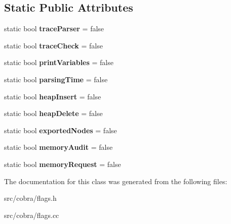 \subsection*{Static Public Attributes}
\begin{DoxyCompactItemize}
\item 
\hypertarget{class_cobra_1_1internal_1_1_flags_ac08d43fe0936cb71bfee597af803dbe2}{static bool {\bfseries trace\+Parser} = false}\label{class_cobra_1_1internal_1_1_flags_ac08d43fe0936cb71bfee597af803dbe2}

\item 
\hypertarget{class_cobra_1_1internal_1_1_flags_a7181e6f3330ab86bff83a6520c74901e}{static bool {\bfseries trace\+Check} = false}\label{class_cobra_1_1internal_1_1_flags_a7181e6f3330ab86bff83a6520c74901e}

\item 
\hypertarget{class_cobra_1_1internal_1_1_flags_ae050100f3071586aebd9a89ec44db04f}{static bool {\bfseries print\+Variables} = false}\label{class_cobra_1_1internal_1_1_flags_ae050100f3071586aebd9a89ec44db04f}

\item 
\hypertarget{class_cobra_1_1internal_1_1_flags_afa0e8679e4526d6edbe06b935da2c4da}{static bool {\bfseries parsing\+Time} = false}\label{class_cobra_1_1internal_1_1_flags_afa0e8679e4526d6edbe06b935da2c4da}

\item 
\hypertarget{class_cobra_1_1internal_1_1_flags_ae77a4d0d2533d664c6234789401ae0fe}{static bool {\bfseries heap\+Insert} = false}\label{class_cobra_1_1internal_1_1_flags_ae77a4d0d2533d664c6234789401ae0fe}

\item 
\hypertarget{class_cobra_1_1internal_1_1_flags_a80d0f082f3e0ea5a10ef9da3ef3d45ed}{static bool {\bfseries heap\+Delete} = false}\label{class_cobra_1_1internal_1_1_flags_a80d0f082f3e0ea5a10ef9da3ef3d45ed}

\item 
\hypertarget{class_cobra_1_1internal_1_1_flags_a1eacd9c9fcaed39873b051cbca8f9424}{static bool {\bfseries exported\+Nodes} = false}\label{class_cobra_1_1internal_1_1_flags_a1eacd9c9fcaed39873b051cbca8f9424}

\item 
\hypertarget{class_cobra_1_1internal_1_1_flags_a14a2af40fa06fc5f063561ffb7497aa4}{static bool {\bfseries memory\+Audit} = false}\label{class_cobra_1_1internal_1_1_flags_a14a2af40fa06fc5f063561ffb7497aa4}

\item 
\hypertarget{class_cobra_1_1internal_1_1_flags_a2ecc52907c7e5aa767258d4aae11f23e}{static bool {\bfseries memory\+Request} = false}\label{class_cobra_1_1internal_1_1_flags_a2ecc52907c7e5aa767258d4aae11f23e}

\end{DoxyCompactItemize}


The documentation for this class was generated from the following files\+:\begin{DoxyCompactItemize}
\item 
src/cobra/flags.\+h\item 
src/cobra/flags.\+cc\end{DoxyCompactItemize}
